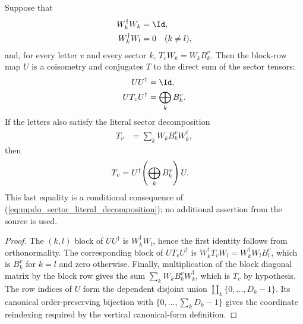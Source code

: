 \begin{theorem}
    \label{thm:vertical_sector_coisometry}
    \leanok
    Suppose that
    \begin{align}
        W_k^\dagger W_k&=\Id,
        \notag\\
        W_k^\dagger W_l&=0\quad(k\ne l),
        \notag
    \end{align}
    and, for every letter $v$ and every sector $k$,
    $T_vW_k=W_kB_k^v$. Then the block-row map $U$ is a coisometry and
    conjugates $T$ to the direct sum of the sector tensors:
    \begin{align}
        UU^\dagger&=\Id,
        \notag\\
        UT_vU^\dagger&=\bigoplus_kB_k^v.
        \notag
    \end{align}
    If the letters also satisfy the literal sector decomposition
    \begin{align}
        T_v&=\sum_kW_kB_k^vW_k^\dagger,
        \label{eq:mpdo_sector_literal_decomposition}
    \end{align}
    then
    \begin{align}
        T_v&=U^\dagger\!\left(\bigoplus_kB_k^v\right)U.
        \notag
    \end{align}
    This last equality is a conditional consequence of
    (\ref{eq:mpdo_sector_literal_decomposition}); no additional assertion
    from the source is used.
\end{theorem}

\begin{proof}
    \leanok
    The $(k,l)$ block of $UU^\dagger$ is $W_k^\dagger W_l$, hence the
    first identity follows from orthonormality. The corresponding block of
    $UT_vU^\dagger$ is
    $W_k^\dagger T_vW_l=W_k^\dagger W_lB_l^v$, which is $B_k^v$ for $k=l$
    and zero otherwise. Finally, multiplication of the block diagonal matrix
    by the block row gives the sum $\sum_kW_kB_k^vW_k^\dagger$, which is
    $T_v$ by hypothesis. The row indices of $U$ form the dependent disjoint
    union $\coprod_k\{0,\ldots,D_k-1\}$. Its canonical order-preserving
    bijection with $\{0,\ldots,\sum_kD_k-1\}$ gives the coordinate reindexing
    required by the vertical canonical-form definition.
\end{proof}

